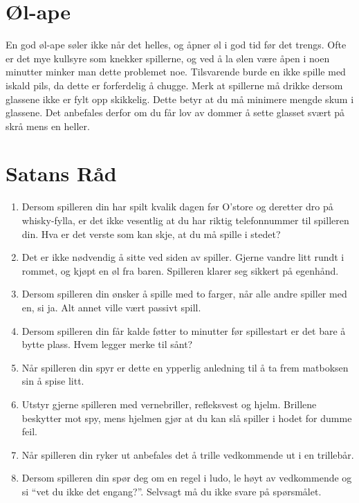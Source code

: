 \documentclass[10pt,a4paper,norsk,openany]{book}
\begin{document}
\section{Øl-ape}
\label{sec:ol-ape}

En god øl-ape søler ikke når det helles, og åpner øl i god tid før det trengs.
Ofte er det mye kullsyre som knekker spillerne, og ved å la ølen være åpen i
noen minutter minker man dette problemet noe. Tilsvarende burde en ikke spille
med iskald pils, da dette er forferdelig å chugge. Merk at spillerne må drikke
dersom glassene ikke er fylt opp skikkelig. Dette betyr at du må minimere
mengde skum i glassene. Det anbefales derfor om du får lov av dommer å sette
glasset svært på skrå mens en heller. 


\section{Satans Råd}

\begin{enumerate}
  \item Dersom spilleren din har spilt kvalik dagen før O'store og deretter
    dro på whisky-fylla, er det ikke
    vesentlig at du har riktig telefonnummer til spilleren din. Hva er det
    verste som kan skje, at du må spille i stedet?
    
  \item Det er ikke nødvendig å sitte ved siden av spiller. Gjerne vandre litt
    rundt i rommet, og kjøpt en øl fra baren. Spilleren klarer seg sikkert på egenhånd.
    
  \item Dersom spilleren din ønsker å spille med to farger, når alle andre
    spiller med en, si ja. Alt annet ville vært passivt spill.

  \item Dersom spilleren din får kalde føtter to minutter før spillestart er det
    bare å bytte plass. Hvem legger merke til sånt?

  \item Når spilleren din spyr er dette en ypperlig anledning til å ta frem
    matboksen sin å spise litt.

  \item Utstyr gjerne spilleren med vernebriller, refleksvest og hjelm. Brillene
    beskytter mot spy, mens hjelmen gjør at du kan slå spiller i hodet for dumme
    feil.

  \item Når spilleren din ryker ut anbefales det å trille vedkommende ut i en
    trillebår.

  \item Dersom spilleren din spør deg om en regel i ludo, le høyt av vedkommende
    og si ``vet du ikke det engang?''. Selvsagt må du ikke svare på spørsmålet.
\end{enumerate}
\end{document}

